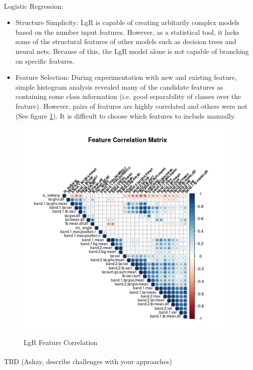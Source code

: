 \documentclass[fleqn,10pt]{SelfArx} %
\begin{document}
\paragraph{}Logistic Regression:
\begin{itemize}
	\item{Structure Simplicity:} LgR is capable of creating arbitarily complex models based on the number input features.  However, as a statistical tool, it lacks some of the structural features of other models such as decision trees and neural nets.  Because of this, the LgR model alone is not capable of branching on specific features.
	\item{Feature Selection:} During experimentation with new and existing feature, simple histogram analysis revealed many of the candidate features as containing some class information (i.e. good separability of classes over the feature).  However, pairs of features are highly correlated and others were not (See figure \ref{correlation}).  It is difficult to choose which features to include manually.
\end{itemize}

\begin{figure}
	\includegraphics[width=.9\linewidth]{iceberg/analysis/corr_matrix.png}
	\caption{LgR Feature Correlation}\label{correlation}
\end{figure}

\paragraph{}TBD (Ashay, describe challenges with your approaches)
\end{document}
